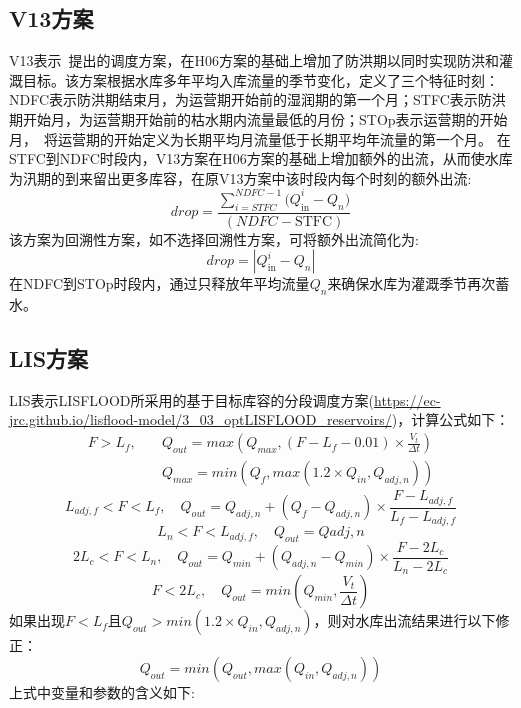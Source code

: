 \subsection{V13方案}
V13表示~\cite{voisin2013improved}提出的调度方案，在H06方案的基础上增加了防洪期以同时实现防洪和灌溉目标。该方案根据水库多年平均入库流量的季节变化，定义了三个特征时刻：NDFC表示防洪期结束月，为运营期开始前的湿润期的第一个月；STFC表示防洪期开始月，为运营期开始前的枯水期内流量最低的月份；STOp表示运营期的开始月，~\cite{hanasaki2006reservoir}将运营期的开始定义为长期平均月流量低于长期平均年流量的第一个月。
在STFC到NDFC时段内，V13方案在H06方案的基础上增加额外的出流，从而使水库为汛期的到来留出更多库容，在原V13方案中该时段内每个时刻的额外出流:
\begin{equation}
    drop = \frac{\sum_{i = STFC}^{NDFC - 1}{{(Q}_{\text{in}}^{i} - Q_{n})}}{\left( NDFC - \text{STFC} \right)}
\end{equation}
该方案为回溯性方案，如不选择回溯性方案，可将额外出流简化为:
\begin{equation}
    drop = \left| Q_{\text{in}}^{i} - Q_{n} \right|
\end{equation}
在NDFC到STOp时段内，通过只释放年平均流量$Q_{n}$来确保水库为灌溉季节再次蓄水。

\subsection{LIS方案}
LIS表示LISFLOOD所采用的基于目标库容的分段调度方案(\url{https://ec-jrc.github.io/lisflood-model/3\_03\_optLISFLOOD\_reservoirs/})，计算公式如下：
\begin{equation}
\begin{aligned}
    F > L_{f}, \quad &Q_{out}={max(Q_{max}, (F-L_{f}-0.01) \times \frac{V_t}{\Delta t})} \\
    \quad &Q_{max} = {min(Q_{f}, {max(1.2 \times Q_{in},Q_{adj,n})})}
\end{aligned}
\end{equation}
\begin{equation}
    L_{adj,f} < F < L_{f}, \quad Q_{out}=Q_{adj,n}+\left(Q_{f}-Q_{adj,n}\right) \times \frac{F-L_{adj,f}}{L_{f}-L_{adj,f}}
\end{equation}
\begin{equation}
    L_{n} < F < L_{adj,f}, \quad Q_{out}=Q{adj,n}
\end{equation}
\begin{equation}
    2L_{c} < F < L_{n}, \quad Q_{out}=Q_{min}+\left(Q_{adj,n}-Q_{min}\right) \times \frac{F-2L_{c}}{L_{n}-2L_{c}}
\end{equation}
\begin{equation}
    F < 2L_{c}, \quad Q_{out}={min(Q_{min}, \frac{V_t}{\Delta t})}
\end{equation}
如果出现$F<L_{f}$且$Q_{out}>{min(1.2 \times Q_{in}, Q_{adj,n})}$，则对水库出流结果进行以下修正：
\begin{equation}
    Q_{out} = {min(Q_{out}, {max(Q_{in}, Q_{adj,n})})}
\end{equation}
上式中变量和参数的含义如下:

